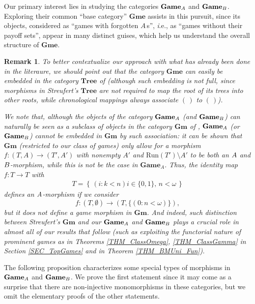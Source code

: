 \documentclass[12pt]{amsart}
\newtheorem{remark}[thm]{Remark}
\theoremstyle{definition}
\newcommand{\set}[1]{\left\{\, {#1} \,\right\}}
\newcommand{\seq}[1]{{\left( {#1} \right)}}
\newcommand{\A}{\textup{\textmd{\textsc{A}}}}
\newcommand{\B}{\textup{\textmd{\textsc{B}}}}
\newcommand{\Run}{{\mathrm{Run}}}
\newcommand{\Games}{\mathbf{Game}}
\newcommand{\Gmes}{\mathbf{Gme}}
\begin{document}
Our primary interest lies in studying the categories $\Games_{\A}$ and $\Games_{\B}$. Exploring their common ``base category'' $\Gmes$ assists in this pursuit, since its objects, considered as ``games with forgotten $A$\,s'', {\textit i.e.}, as ``games without their payoff sets'', appear in many distinct guises, which help us understand the overall structure of $\Gmes$.

\begin{remark}
	To better contextualize our approach with what has already been done in the literaure, we should point out that the category $\Gmes$ can easily be embedded in the category $\mathbf{Tree}$ of \cite{Streufert2018} (although such embedding is not full, since morphisms in Streufert's $\mathbf{Tree}$ are not required to map the root of its trees into other roots, while chronological mappings always associate $\seq{\,}$ to $\seq{\,}$). 
	
	We note that, although the objects of the category $\Games_{\A}$ (and $\Games_{\B}$) can naturally be seen as a subclass of objects in the category $\mathbf{Gm}$ of \cite{Streufert2021}, $\Games_{\A}$ (or $\Games_{\B}$) cannot be embedded in $\mathbf{Gm}$ by such association: it can be shown that $\mathbf{Gm}$ (restricted to our class of games) only allow for a morphism $f\colon (T,A)\to (T',A')$ with nonempty $A'$ and $\Run(T')\setminus A'$ to be \emph{both} an $\A$ and $\B$-morphism, while this is not be the case in $\Games_{A}$. Thus, the identity map $f\colon T\to T$ with
	\begin{gather*}
		T = \set{\seq{i:k<n}i\in \{0,1\}, \, n<\omega}
	\end{gather*} 
	defines an $\A$-morphism if we consider 
	\[f\colon (T,\emptyset)\to (T,\{\seq{0:n<\omega}\}),\] 
	but it does not define a game morphism in $\mathbf{Gm}$. And indeed, such distinction between Streufert's $\mathbf{Gm}$ and our $\Games_{\A}$ and $\Games_{\B}$ plays a crucial role in almost all of our results that follow (such as exploiting the functorial nature of prominent games as in Theorems  \ref{THM_ClassOmega}, \ref{THM_ClassGamma} in Section \ref{SEC_TopGames} and in Theorem \ref{THM_BMUni_Fun}).
\end{remark}


The following proposition characterizes some special types of morphisms in $\Games_{\A}$ and $\Games_{\B}$. We prove the first statement since it may come as a surprise that there are non-injective monomorphisms in these categories,  but we omit the elementary proofs of the other statements.
\end{document}
